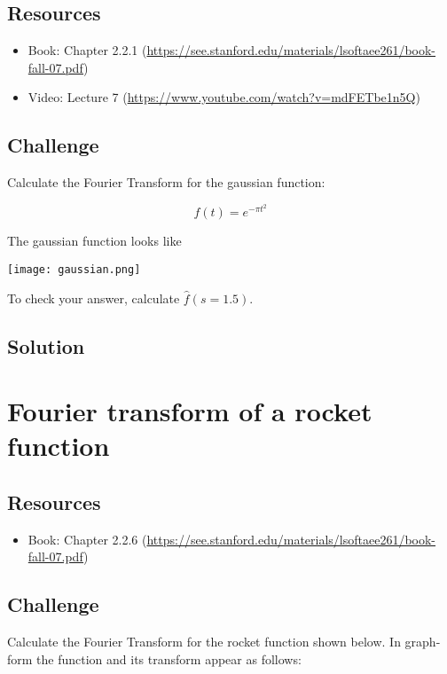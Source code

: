 \subsection*{Resources}
\begin{itemize}
    \item Book: Chapter 2.2.1 (\url{https://see.stanford.edu/materials/lsoftaee261/book-fall-07.pdf})
    \item Video: Lecture 7 (\url{https://www.youtube.com/watch?v=mdFETbe1n5Q})
\end{itemize}

\subsection*{Challenge}
Calculate the Fourier Transform for the gaussian function:

\begin{equation}
    f(t) = e^{-\pi t^2}
\end{equation}

The gaussian function looks like

\texttt{[image: gaussian.png]}

To check your answer, calculate $\hat{f}(s=1.5)$.

\subsection*{Solution}




\newpage
\section{Fourier transform of a rocket function}

\subsection*{Resources}
\begin{itemize}
    \item Book: Chapter 2.2.6 (\url{https://see.stanford.edu/materials/lsoftaee261/book-fall-07.pdf})
\end{itemize}

\subsection*{Challenge}
Calculate the Fourier Transform for the rocket function shown below. In graph-form the function and its transform appear as follows:

